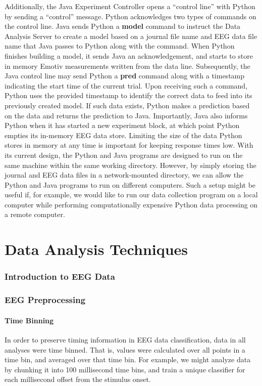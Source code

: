 \documentclass[12pt]{report}
\begin{document}
	Additionally, the Java Experiment Controller opens a ``control line'' with Python by sending a ``control'' message.  Python acknowledges two types of commands on the control line.  Java sends Python a {\bf model} command to instruct the Data Analysis Server to create a model based on a journal file name and EEG data file name that Java passes to Python along with the command.  When Python finishes building a model, it sends Java an acknowledgement, and starts to store in memory Emotiv measurements written from the data line.  Subsequently, the Java control line may send Python a {\bf pred} command along with a timestamp indicating the start time of the current trial.  Upon receiving such a command, Python uses the provided timestamp to identify the correct data to feed into its previously created model.  If such data exists, Python makes a prediction based on the data and returns the prediction to Java.  Importantly, Java also informs Python when it has started a new experiment block, at which point Python empties its in-memory EEG data store.  Limiting the size of the data Python stores in memory at any time is important for keeping response times low.  
	With its current design, the Python and Java programs are designed to run on the same machine within the same working directory.  However, by simply storing the journal and EEG data files in a network-mounted directory, we can allow the Python and Java programs to run on different computers.  Such a setup might be useful if, for example, we would like to run our data collection program on a local computer while performing computationally expensive Python data processing on a remote computer.


\chapter{Data Analysis Techniques \label{dataanalysis}}

\subsection{Introduction to EEG Data}
\subsection{EEG Preprocessing}


\subsubsection{Time Binning}
	In order to preserve timing information in EEG data classification, data in all analyses were time binned.  That is, values were calculated over all points in a time bin, and averaged over that time bin.  For example, we might analyze data by chunking it into 100 millisecond time bins, and train a unique classifier for each millisecond offset from the stimulus onset.
	
\end{document}
